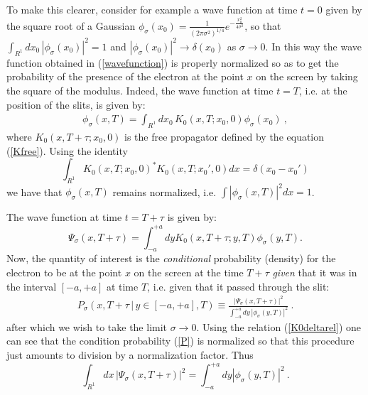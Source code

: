 \documentclass[12pt,aps,prb,preprint]{revtex4-1}   %
\begin{document}
To make this clearer, consider for example a wave function at time
$t=0$ given by the square root of a Gaussian $\phi_\sigma(x_0) =
\frac{1}{(2\pi\sigma^2)^{1/4}} e^{-\frac{x_0^2}{4\sigma^2}}$, so
that $\int_{R^1} dx_0\,|\phi_\sigma(x_0)|^2 = 1$ and
$|\phi_\sigma(x_0)|^2 \rightarrow \delta(x_0)$ as $\sigma
\rightarrow 0$. In this way the wave function obtained in
(\ref{wavefunction}) is properly normalized so as to get the
probability of the presence of the electron at the point $x$ on
the screen by taking the square of the modulus. Indeed, the wave
function at time $t=T$, i.e. at the position of the slits, is
given by:
\begin{eqnarray}
\phi_\sigma(x,T) = \int_{R^1} dx_0\, K_0(x,T;x_0,0)
\phi_\sigma(x_0)\ ,
\end{eqnarray}
where  $K_0(x,T+\tau;x_0,0)$ is the free propagator defined by the
equation (\ref{Kfree}). Using the identity \begin{equation}
\label{K0deltarel}  \int_{R^1} K_0(x,T;x_0,0)^* K_0(x,T; x_0',0)
dx = \delta(x_0-x_0')
\end{equation} we have that $\phi_\sigma(x,T)$ remains normalized, i.e.
$\int |\phi_\sigma(x,T)|^2 dx = 1$.

The wave function at time $t=T+\tau$ is given by:
\begin{equation}
\Psi_\sigma(x,T+\tau) = \int_{-a}^{+a}dy
K_0(x,T+\tau;y,T)\phi_\sigma(y,T). \label{wavefunction}
\end{equation}
Now, the quantity of interest is the \textit{conditional}
probability (density) for the electron to be at the point $x$ on
the screen at the time $T+\tau$ \textit{given} that it was in the
interval $[-a,+a]$ at time $T$, i.e. given that it passed through
the slit:
\begin{eqnarray}\label{P}
P_\sigma\left(x,T+\tau \,|\,y\in [-a,+a],T\right) \equiv
\frac{|\Psi_\sigma(x,T+\tau)|^2}{\int_{-a}^{+a} dy\,
|\phi_\sigma(y,T)|^2}\ .
\end{eqnarray}
after which we wish to take the limit $\sigma\rightarrow0$. Using
the relation (\ref{K0deltarel}) one can see that the condition
probability (\ref{P}) is normalized so that this procedure just
amounts to division by a normalization factor. Thus
\begin{equation}\label{Z}
\int_{R^1} dx\, |\Psi_\sigma(x,T+\tau)|^2 = \int_{-a}^{+a}dy
|\phi_\sigma(y,T)|^2\ .
\end{equation}
\end{document}
